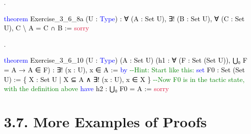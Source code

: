 \documentclass[
  letterpaper,
  DIV=11,
  numbers=noendperiod]{scrreprt}
\makeatletter
\newenvironment{Shaded}{\begin{snugshade}}{\end{snugshade}}
\newcommand{\CommentTok}[1]{\textcolor[rgb]{0.37,0.37,0.37}{#1}}
\newcommand{\ConstantTok}[1]{\textcolor[rgb]{0.56,0.35,0.01}{#1}}
\newcommand{\KeywordTok}[1]{\textcolor[rgb]{0.00,0.23,0.31}{#1}}
\newcommand{\NormalTok}[1]{\textcolor[rgb]{0.00,0.23,0.31}{#1}}
\newcommand{\SpecialCharTok}[1]{\textcolor[rgb]{0.37,0.37,0.37}{#1}}
\newcommand{\WarningTok}[1]{\textcolor[rgb]{0.37,0.37,0.37}{\textit{#1}}}
\def\redsquiggly{\bgroup \markoverwith{\textcolor{red}{\lower3.5\p@\hbox{\sixly \char58}}}\ULon}
\renewcommand{\NormalTok}[1]{\textcolor[HTML]{000000}{#1}}
\renewcommand{\KeywordTok}[1]{\textcolor[HTML]{0000FF}{#1}}
\renewcommand{\SpecialCharTok}[1]{}
\renewcommand{\WarningTok}[1]{\redsquiggly{\textcolor[HTML]{0000FF}{#1}}}
\renewcommand{\CommentTok}[1]{\textcolor[HTML]{008000}{#1}}
\renewcommand{\ConstantTok}[1]{\textcolor[HTML]{DC143C}{#1}}
\newcommand{\nobreakShaded}{\renewenvironment{Shaded}
	{\begin{tcolorbox}[frame hidden, enhanced, interior hidden, boxrule=0pt,
		borderline west={3pt}{0pt}{shadecolor}, sharp corners]}
	{\end{tcolorbox}}}
\newenvironment{numex}[1]
	{\begin{minipage}[t]{0.04\textwidth}\vspace{8pt}{#1}.
		\end{minipage}\nobreakShaded\begin{minipage}[t]{0.96\textwidth}\vspace{0pt}}
	{\end{minipage}}
\theoremstyle{remark}
\makeatother
\begin{document}
\begin{numex}{5}

\begin{Shaded}
\begin{Highlighting}[]
\KeywordTok{theorem}\NormalTok{ Exercise\_3\_6\_8a (U : }\KeywordTok{Type}\NormalTok{) : ∀ (A : Set U),}
\NormalTok{    ∃! (B : Set U), ∀ (C : Set U), C \textbackslash{} A = C ∩ B := }\ConstantTok{sorry}
\end{Highlighting}
\end{Shaded}

\end{numex}

\begin{numex}{6}

\begin{Shaded}
\begin{Highlighting}[]
\KeywordTok{theorem}\NormalTok{ Exercise\_3\_6\_10 (U : }\KeywordTok{Type}\NormalTok{) (A : Set U)}
\NormalTok{    (h1 : ∀ (F : Set (Set U)), ⋃₀ F = A → A ∈ F) :}
\NormalTok{    ∃! (x : U), x ∈ A := }\KeywordTok{by}
  \CommentTok{{-}{-}Hint:  Start like this:}
  \KeywordTok{set}\NormalTok{ F0 : Set (Set U) := \{ X : Set U | X ⊆ A ∧ ∃! (x : U), x ∈ X \}}
  \CommentTok{{-}{-}Now F0 is in the tactic state, with the definition above}
  \KeywordTok{have}\NormalTok{ h2 : ⋃₀ F0 = A := }\ConstantTok{sorry}
  
  \SpecialCharTok{**}\WarningTok{done}\SpecialCharTok{::}
\end{Highlighting}
\end{Shaded}

\end{numex}

\hypertarget{more-examples-of-proofs}{%
\section{3.7. More Examples of Proofs}\label{more-examples-of-proofs}}
\end{document}
